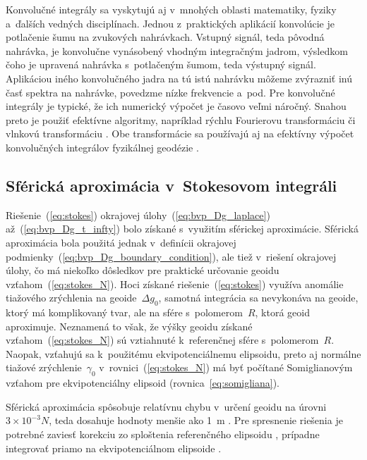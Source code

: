 \documentclass[a4paper, 12pt]{book}
\begin{document}
Konvolučné integrály sa vyskytujú aj v~mnohých oblasti matematiky, fyziky 
a~ďalších vedných disciplínach.  Jednou z~praktických aplikácií konvolúcie je 
potlačenie šumu na zvukových nahrávkach.  Vstupný signál, teda pôvodná 
nahrávka, je konvolučne vynásobený vhodným integračným jadrom, výsledkom čoho 
je upravená nahrávka s~potlačeným šumom, teda výstupný signál.  Aplikáciou 
iného konvolučného jadra na tú istú nahrávku môžeme zvýrazniť inú časť spektra 
na nahrávke, povedzme nízke frekvencie a~pod.  Pre konvolučné integrály je 
typické, že ich numerický výpočet je časovo veľmi náročný.  Snahou preto je 
použiť efektívne algoritmy, napríklad rýchlu Fourierovu transformáciu 
\parencite{PressNumericalRecipes} či vlnkovú transformáciu 
\parencite{KellerWavelets}.  Obe transformácie sa používajú aj na efektívny 
výpočet konvolučných integrálov fyzikálnej geodézie \parencite[pozri 
napríklad][]{Forsberg1984,Freeden1998a,SansoGeoidDetermination}.


\subsection{Sférická aproximácia v~Stokesovom integráli}
\label{sec:stokes_spherical_approximation}

Riešenie~(\ref{eq:stokes}) okrajovej úlohy~(\ref{eq:bvp_Dg_laplace}) 
až~(\ref{eq:bvp_Dg_t_infty}) bolo získané s~využitím sférickej aproximácie.  
Sférická aproximácia bola použitá jednak v~definícii okrajovej 
podmienky~(\ref{eq:bvp_Dg_boundary_condition}), ale tiež v~riešení okrajovej 
úlohy, čo má niekoľko dôsledkov pre praktické určovanie geoidu 
vzťahom~(\ref{eq:stokes_N}).  Hoci získané riešenie~(\ref{eq:stokes}) využíva 
anomálie tiažového zrýchlenia na geoide~$\Delta g_0$, samotná integrácia sa 
nevykonáva na geoide, ktorý má komplikovaný tvar, ale na sfére s~polomerom~$R$, 
ktorá geoid aproximuje.  Neznamená to však, že výšky geoidu získané 
vzťahom~(\ref{eq:stokes_N}) sú vztiahnuté k~referenčnej sfére s~polomerom~$R$.  
Naopak, vzťahujú sa k~použitému ekvipotenciálnemu elipsoidu, preto aj normálne 
tiažové zrýchlenie~$\gamma_0$ v~rovnici~(\ref{eq:stokes_N}) má byť počítané 
Somiglianovým vzťahom pre ekvipotenciálny elipsoid 
(rovnica~\ref{eq:somigliana}).

Sférická aproximácia spôsobuje relatívnu chybu v~určení geoidu na úrovni~$3 
\times 10^{-3} N$, teda dosahuje hodnoty menšie ako 1~m 
\parencite{MoritzPhysicalGeodesy}.  Pre spresnenie riešenia je potrebné zaviesť 
korekciu zo sploštenia referenčného elipsoidu \parencite[pozri 
napríklad][]{Claessens2006}, prípadne integrovať priamo na ekvipotenciálnom 
elipsoide \parencite{Martinec1997}.
\end{document}
